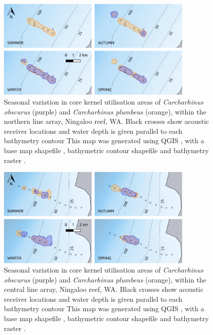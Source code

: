 \documentclass[11pt,a4paper]{article}
\begin{document}
	
	\begin{figure}[h!]
		\centering\includegraphics[width=0.85\textwidth]{../Results/north.pdf}
		\caption{Seasonal variation in core kernel utilisation areas of \textit{Carcharhinus obscurus} (purple) and \textit{Carcharhinus plumbeus} (orange), within the northern line array, Ningaloo reef, WA. Black crosses show acoustic receiver locations and water depth is given parallel to each bathymetry contour This map was generated using QGIS \citep{QGISDevelopmentTeam2019}, with a base map shapefile \citep{AustralianBureauofStatistics2011}, bathymetric contour shapefile \citep{GEBCOCompilationGroup2019} and bathymetry raster \citep{Whiteway2009}.}
		\label{depth_north}
	\end{figure}		
	\begin{figure}[h!]
		\centering\includegraphics[width=0.85\textwidth]{../Results/mid.pdf}
		\caption{Seasonal variation in core kernel utilisation areas of \textit{Carcharhinus obscurus} (purple) and \textit{Carcharhinus plumbeus} (orange), within the central line array, Ningaloo reef, WA. Black crosses show acoustic receiver locations and water depth is given parallel to each bathymetry contour This map was generated using QGIS \citep{QGISDevelopmentTeam2019}, with a base map shapefile \citep{AustralianBureauofStatistics2011}, bathymetric contour shapefile \citep{GEBCOCompilationGroup2019} and bathymetry raster \citep{Whiteway2009}.}
		\label{depth_mid}
	\end{figure}		
\end{document}
